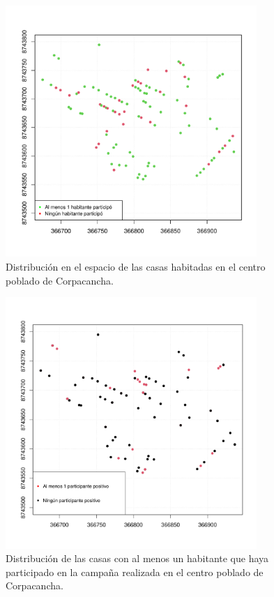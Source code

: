\newpage

\begin{figure}[h]\label{houses_participation}
	\begin{center}
		\includegraphics[width=0.85\textwidth]{graficos/houses_participation.pdf}
	\end{center}
	\caption{Distribución en el espacio de las casas habitadas en el centro poblado de Corpacancha.}
\end{figure}

\newpage

\begin{figure}[h]\label{houses_hidatidosis}
	\begin{center}
		\includegraphics[width=0.85\textwidth]{graficos/houses_hidatidosis.pdf}
	\end{center}
	\caption{Distribución de las casas con al menos un habitante que haya participado en la campaña realizada en el centro poblado de Corpacancha.}
\end{figure}

